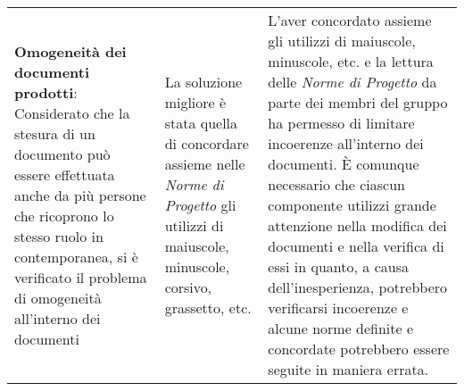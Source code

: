 \begin{longtable}{ 
				>{\centering}p{}
				>{\centering}p{}
				>{\centering\arraybackslash}p{}}
				\textbf{Omogeneità dei documenti prodotti}: Considerato che la stesura di un documento può essere effettuata anche da più persone che ricoprono lo stesso ruolo in contemporanea, si è verificato il problema di omogeneità all'interno dei documenti
					&
				La soluzione migliore è stata quella di concordare assieme nelle \textit{Norme di Progetto} gli utilizzi di maiuscole, minuscole, corsivo, grassetto, etc.
					&
				L'aver concordato assieme gli utilizzi di maiuscole, minuscole, etc. e la lettura delle \textit{Norme di Progetto} da parte dei membri del gruppo ha permesso di limitare incoerenze all'interno dei documenti. È comunque necessario che ciascun componente utilizzi grande attenzione nella modifica dei documenti e nella verifica di essi in quanto, a causa dell'inesperienza, potrebbero verificarsi incoerenze e alcune norme definite e concordate potrebbero essere seguite in maniera errata.
					\\
				
			\end{longtable}
	
	
		
	
	
	
